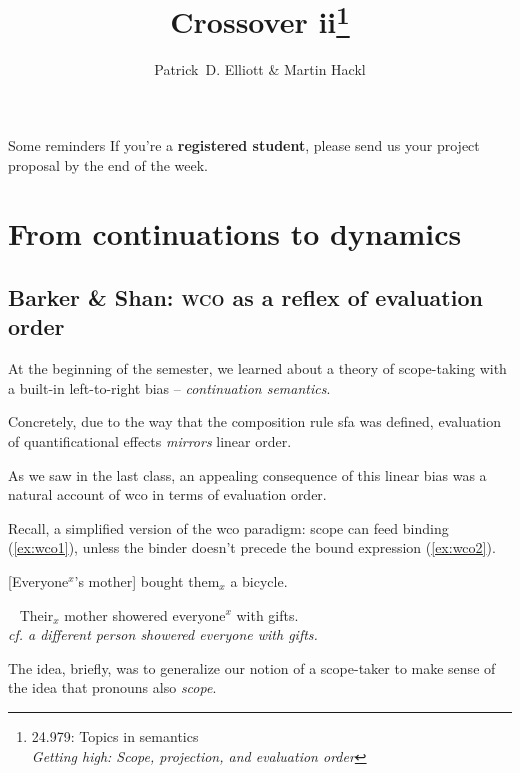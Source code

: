 \documentclass[nols,twoside,nofonts,nobib,nohyper]{tufte-handout}
\title{Crossover ii\thanks{24.979: Topics in
    semantics\\\noindent\textit{Getting high: Scope, projection, and evaluation order}}}
\author[Patrick D. Elliott and Martin Hackl]{Patrick~D. Elliott \& Martin Hackl}
\begin{document}
\maketitle%

\begin{tcolorbox}
  Some reminders
  \tcblower
  If you're a \textbf{registered student}, please send us your project proposal
  by the end of the week.
\end{tcolorbox}

\section{From continuations to dynamics}

\subsection{Barker \& Shan: \textsc{wco} as a reflex of evaluation order}

At the beginning of the semester, we learned about a theory of scope-taking with
a built-in left-to-right bias -- \textit{continuation semantics}.

Concretely, due to the way that the composition rule \ac{sfa} was defined,
evaluation of quantificational effects \textit{mirrors} linear
order.

As we saw in the last class, an appealing consequence of this linear bias was a
natural account of \acf{wco} in terms of evaluation order.

Recall, a simplified version of the \ac{wco} paradigm: scope can feed binding
(\ref{ex:wco1}), unless the binder doesn't precede the bound expression (\ref{ex:wco2}).

\ex
{}[Everyone$^{x}$'s mother] bought them$_{x}$ a bicycle.\label{ex:wco1}
\xe

\ex~
Their$_{x}$ mother showered everyone$^{x}$ with gifts.\\
\textit{cf. a different person showered everyone with gifts.}\label{ex:wco2}
\xe

The idea, briefly, was to generalize our notion of a scope-taker to make sense
of the idea that pronouns also \textit{scope}.
\end{document}
